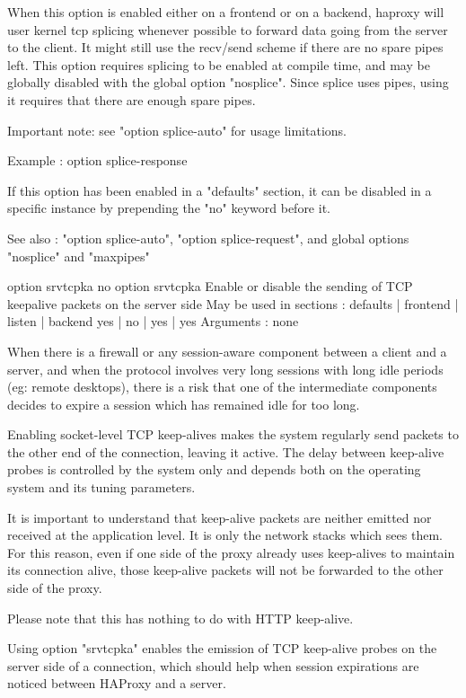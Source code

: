   When this option is enabled either on a frontend or on a backend, haproxy
  will user kernel tcp splicing whenever possible to forward data going from
  the server to the client. It might still use the recv/send scheme if there
  are no spare pipes left. This option requires splicing to be enabled at
  compile time, and may be globally disabled with the global option "nosplice".
  Since splice uses pipes, using it requires that there are enough spare pipes.

  Important note: see "option splice-auto" for usage limitations.

  Example :
        option splice-response

  If this option has been enabled in a "defaults" section, it can be disabled
  in a specific instance by prepending the "no" keyword before it.

  See also : "option splice-auto", "option splice-request", and global options
             "nosplice" and "maxpipes"


option srvtcpka
no option srvtcpka
  Enable or disable the sending of TCP keepalive packets on the server side
  May be used in sections :   defaults | frontend | listen | backend
                                 yes   |    no    |   yes  |   yes
  Arguments : none

  When there is a firewall or any session-aware component between a client and
  a server, and when the protocol involves very long sessions with long idle
  periods (eg: remote desktops), there is a risk that one of the intermediate
  components decides to expire a session which has remained idle for too long.

  Enabling socket-level TCP keep-alives makes the system regularly send packets
  to the other end of the connection, leaving it active. The delay between
  keep-alive probes is controlled by the system only and depends both on the
  operating system and its tuning parameters.

  It is important to understand that keep-alive packets are neither emitted nor
  received at the application level. It is only the network stacks which sees
  them. For this reason, even if one side of the proxy already uses keep-alives
  to maintain its connection alive, those keep-alive packets will not be
  forwarded to the other side of the proxy.

  Please note that this has nothing to do with HTTP keep-alive.

  Using option "srvtcpka" enables the emission of TCP keep-alive probes on the
  server side of a connection, which should help when session expirations are
  noticed between HAProxy and a server.

